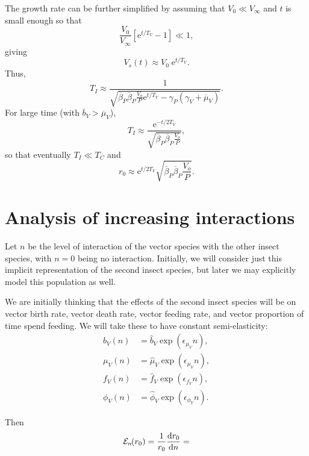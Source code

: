 \documentclass{article}
\newcommand{\md}{\mathrm{d}}
\newcommand{\me}{\mathrm{e}}
\begin{document}
The growth rate can be further simplified by assuming that
$V_0 \ll V_{\infty}$ and $t$ is small enough so that
\begin{equation}
  \frac{V_0}{V_\infty}
  \left[\me^{t / T_V} - 1\right]
  \ll 1,
\end{equation}
giving
\begin{equation}
  V_s(t) \approx V_0 \; \me^{t / T_V}.
\end{equation}
Thus,
\begin{equation}
  T_I
  \approx \frac{1}{\sqrt{\overline{\beta}_P \overline{\beta}_P
      \frac{V_o}{P} \me^{t / T_V}
      - \gamma_P (\gamma_V + \overline{\mu}_V)}}.
\end{equation}
For large time (with $\overline{b}_V > \overline{\mu}_V$),
\begin{equation}
  T_I \approx \frac{
    \me^{- t / 2 T_V}}
  {\sqrt{\overline{\beta}_P \overline{\beta}_P \frac{V_o}{P}}},
\end{equation}
so that eventually $T_I \ll T_C$ and
\begin{equation}
  r_0 \approx 
  \me^{t / 2 T_V}
  \sqrt{\overline{\beta}_P \overline{\beta}_P \frac{V_o}{P}}.
\end{equation}



\section{Analysis of increasing interactions}

Let $n$ be the level of interaction of the vector species with the
other insect species, with $n = 0$ being no interaction.  Initially,
we will consider just this implicit representation of the second insect
species, but later we may explicitly model this population as well.

We are initially thinking that the effects of the second insect
species will be on vector birth rate, vector death rate, vector
feeding rate, and vector proportion of time spend feeding.  We will
take these to have constant semi-elasticity:
\begin{equation}
  \begin{split}
    b_V(n) &= \hat{b}_V \exp\left(\epsilon_{\mu_V} n\right),
    \\
    \mu_V(n) &= \hat{\mu}_V \exp\left(\epsilon_{\mu_{V}} n\right),
    \\
    f_V(n) &= \hat{f}_V \exp\left(\epsilon_{f_V} n\right),
    \\
    \phi_V(n) &= \hat{\phi}_V \exp\left(\epsilon_{\phi_V} n\right).
  \end{split}
\end{equation}

\newcommand{\elasticity}[2]{\mathcal{E}_{#2}\negthickspace\left({#1}\right)}
Then
\begin{equation}
  \elasticity{r_0}{n} =
  \frac{1}{r_0} \frac{\md r_0}{\md n} =
\end{equation}
\end{document}
